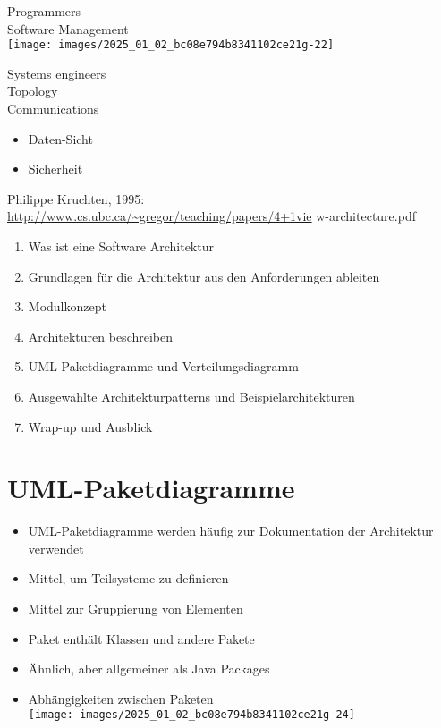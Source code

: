 \documentclass[10pt]{article}
\begin{document}
Programmers\\
Software Management\\
\texttt{[image: images/2025\_01\_02\_bc08e794b8341102ce21g-22]}

Systems engineers\\
Topology\\
Communications

\begin{itemize}
  \item Daten-Sicht
  \item Sicherheit
\end{itemize}

Philippe Kruchten, 1995:\\
\href{http://www.cs.ubc.ca/~gregor/teaching/papers/4+1vie}{http://www.cs.ubc.ca/\~{}gregor/teaching/papers/4+1vie} w-architecture.pdf

\begin{enumerate}
  \item Was ist eine Software Architektur
  \item Grundlagen für die Architektur aus den Anforderungen ableiten
  \item Modulkonzept
  \item Architekturen beschreiben
  \item UML-Paketdiagramme und Verteilungsdiagramm
  \item Ausgewählte Architekturpatterns und Beispielarchitekturen
  \item Wrap-up und Ausblick
\end{enumerate}

\section*{UML-Paketdiagramme}
\begin{itemize}
  \item UML-Paketdiagramme werden häufig zur Dokumentation der Architektur verwendet
  \item Mittel, um Teilsysteme zu definieren
  \item Mittel zur Gruppierung von Elementen
  \item Paket enthält Klassen und andere Pakete
  \item Ähnlich, aber allgemeiner als Java Packages
  \item Abhängigkeiten zwischen Paketen\\
\texttt{[image: images/2025\_01\_02\_bc08e794b8341102ce21g-24]}
\end{itemize}
\end{document}
